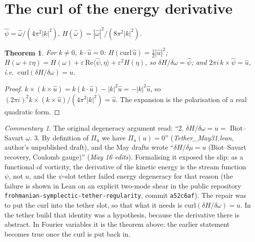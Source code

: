 \documentclass[11pt]{article}
\newtheorem{theorem}{Theorem}\newtheorem{lemma}[theorem]{Lemma}
\theoremstyle{remark}\newtheorem*{commentary}{Commentary}
\begin{document}
\section{The curl of the energy derivative}
$\hat\psi=\hat\omega/(4\pi^2|k|^2)$, $H(\hat\omega)=|\hat\omega|^2/(8\pi^2|k|^2)$.
\begin{theorem} For $k\ne0$, $k\cdot\hat u=0$: $H(\mathrm{curl}\,\hat u)=\tfrac12|\hat u|^2$;
$H(\omega+\varepsilon\eta)=H(\omega)+\varepsilon\,\mathrm{Re}\langle\hat\psi,\eta\rangle+\varepsilon^2H(\eta)$, so
$\delta H/\delta\omega=\hat\psi$; and $2\pi i\,k\times\hat\psi=\hat u$, i.e.\ $\mathrm{curl}(\delta H/\delta\omega)=u$.\end{theorem}
\begin{proof} $k\times(k\times\hat u)=k(k\cdot\hat u)-|k|^2\hat u=-|k|^2\hat u$, so
$(2\pi i)^2k\times(k\times\hat u)/(4\pi^2|k|^2)=\hat u$. The expansion is the polarisation of a real quadratic form.\end{proof}
\begin{commentary} The original degeneracy argument read: ``2. $\delta H/\delta\omega = u =$
Biot--Savart $\omega$. 3. By definition of $\Pi_u$ we have $\Pi_u(u)=0$'' (\emph{Tether\_May31.lean},
author's unpublished draft), and the May drafts wrote ``$\delta H/\delta\mu=u$ (Biot--Savart recovery, Coulomb gauge)''
(\emph{May 16 edits}). Formalising it exposed the slip: as a functional of vorticity, the derivative
of the kinetic energy is the stream function $\psi$, not $u$, and the $\psi$-slot tether failed energy
degeneracy for that reason (the failure is shown in Lean on an explicit two-mode shear in the public repository \texttt{frohmanian-symplectic-tether-regularity}, commit \texttt{a52c6af}). The repair was to put the curl into the tether slot, so that what it
needs is $\mathrm{curl}(\delta H/\delta\omega)=u$. In the tether build that identity was a hypothesis,
because the derivative there is abstract. In Fourier variables it is the theorem above: the earlier
statement becomes true once the curl is put back in.\end{commentary}
\end{document}
